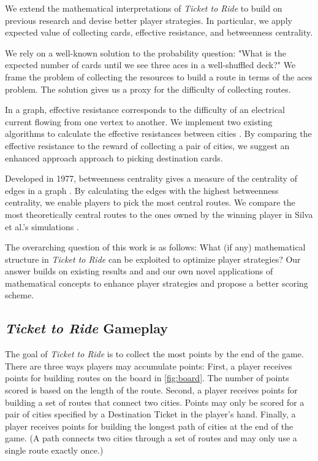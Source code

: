 We extend the mathematical interpretations of
\textit{Ticket to Ride} to build on previous research
and devise better player strategies.
In particular, we apply expected value of collecting cards,
effective resistance, and betweenness centrality.

We rely on a well-known solution to the probability question:
"What is the expected number of cards until
we see three aces in a well-shuffled deck?"
We frame the problem of collecting the resources
to build a route in terms of the aces problem.
The solution gives us a proxy for the difficulty
of collecting routes.

In a graph, effective resistance corresponds
to the difficulty of an electrical current flowing
from one vertex to another.
We implement two existing algorithms to calculate
the effective resistances between cities
\cite{ellens2011effective, wu2004theory}.
By comparing the effective resistance to the reward
of collecting a pair of cities, we suggest an enhanced approach 
approach to picking destination cards.

Developed in 1977, betweenness centrality gives a measure
of the centrality of edges in a graph
\cite{freeman1977set}.
By calculating the edges with the highest betweenness centrality,
we enable players to pick the most central routes.
We compare the most theoretically central routes
to the ones owned by the winning player in Silva et al.'s
simulations \cite{de2017playtesting}.

The overarching question of this work is as follows:
What (if any) mathematical structure in \textit{Ticket to Ride}
can be exploited to optimize player strategies?
Our answer builds on existing results and
and our own novel applications of mathematical concepts to enhance
player strategies and propose a better scoring scheme.

\subsection{\textit{Ticket to Ride} Gameplay}

The goal of \textit{Ticket to Ride} is to collect
the most points by the end of the game.
There are three ways players may accumulate points:
First, a player receives points for building routes
on the board in \cref{fig:board}.
The number of points scored is based on the length of the route.
Second, a player receives points for building
a set of routes that connect two cities.
Points may only be scored for a pair of cities specified by a 
Destination Ticket in the player's hand.
Finally, a player receives points for building
the longest path of cities at the end of the game.
(A path connects two cities through a set
of routes and may only use a single route exactly once.)

